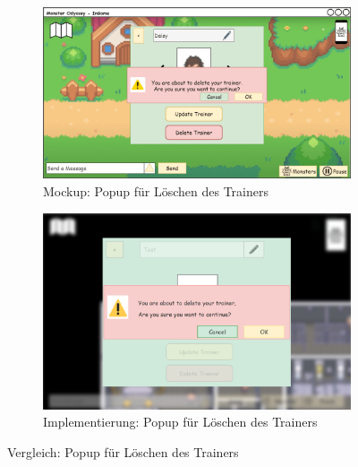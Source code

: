 \begin{figure}[H]
    \centering
    \begin{subfigure}[b]{0.4\textwidth}
        \includegraphics[width=\textwidth]{images/mockups/Bonusfeatures/TrainerSettings/IngameDeleteTrainerPopup.png}
        \caption{Mockup: Popup für Löschen des Trainers}
        \label{fig: Mockup: Popup beim Löschen des Trainers}
    \end{subfigure}
    \hfill
    \begin{subfigure}[b]{0.4\textwidth}
        \includegraphics[width=\textwidth]{images/implementation/Bonusfeatures/TrainerSettings/DeleteTrainer.png}
        \caption{Implementierung: Popup für Löschen des Trainers}
        \label{fig: Implementierung: Popup für Löschen des Trainers}
    \end{subfigure}
    \caption{Vergleich: Popup für Löschen des Trainers}
    \label{fig: Vergleich: Popup für Löschen des Trainers}
\end{figure}